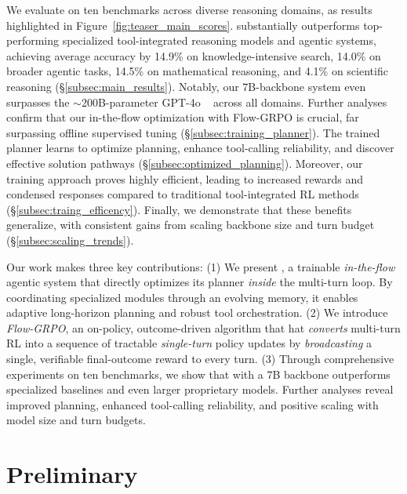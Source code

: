 We evaluate \model on ten benchmarks across diverse reasoning domains, as results highlighted in Figure~\ref{fig:teaser_main_scores}.
\model substantially outperforms top-performing specialized tool-integrated reasoning models and agentic systems, achieving average accuracy by 14.9\% on knowledge-intensive search, 14.0\% on broader agentic tasks, 14.5\% on mathematical reasoning, and 4.1\% on scientific reasoning (\S\ref{subsec:main_results}). 
Notably, our 7B-backbone system even surpasses the $\sim$200B-parameter GPT-4o ~\citep{hurst2024gpt} across all domains. Further analyses confirm that our in-the-flow optimization with Flow-GRPO is crucial, far surpassing offline supervised tuning (\S\ref{subsec:training_planner}). The trained planner learns to optimize planning, enhance tool-calling reliability, and discover effective solution pathways (\S\ref{subsec:optimized_planning}). Moreover, our training approach proves highly efficient, leading to increased rewards and condensed responses compared to traditional tool-integrated RL methods (\S\ref{subsec:traing_efficency}). Finally, we demonstrate that these benefits generalize, with consistent gains from scaling backbone size and turn budget (\S\ref{subsec:scaling_trends}).

Our work makes three key contributions: 
(1) We present \model, a trainable \emph{in-the-flow} agentic system that directly optimizes its planner \emph{inside} the multi-turn loop. By coordinating specialized modules through an evolving memory, it enables adaptive long-horizon planning and robust tool orchestration.
(2) We introduce \emph{Flow-GRPO}, an on-policy, outcome-driven algorithm that hat \emph{converts} multi-turn RL into a sequence of tractable \emph{single-turn} policy updates by \emph{broadcasting} a single, verifiable final-outcome reward to every turn.
(3) Through comprehensive experiments on ten benchmarks, we show that \model with a 7B backbone outperforms specialized baselines and even larger proprietary models. Further analyses reveal improved planning, enhanced tool-calling reliability, and positive scaling with model size and turn budgets.

\vspace{-2mm}
\section{Preliminary}
\label{sec:preliminary}
\vspace{-1mm}

